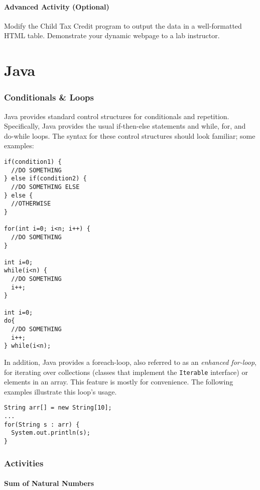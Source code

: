 \documentclass[12pt]{scrartcl}
\begin{document}
\subsection*{Advanced Activity (Optional)}
	
Modify the Child Tax Credit program to output the data in a 
well-formatted HTML table.  Demonstrate your dynamic webpage 
to a lab instructor.


\newpage
\part*{Java}

\section*{Conditionals \& Loops}

Java provides standard control structures for conditionals and 
repetition.  Specifically, Java provides the usual if-then-else 
statements and while, for, and do-while loops.  The syntax for 
these control structures should look familiar; some examples:

\begin{verbatim}
if(condition1) {
  //DO SOMETHING
} else if(condition2) {
  //DO SOMETHING ELSE
} else {
  //OTHERWISE
}

for(int i=0; i<n; i++) {
  //DO SOMETHING
}

int i=0;
while(i<n) {
  //DO SOMETHING
  i++;
}

int i=0;
do{ 
  //DO SOMETHING
  i++;
} while(i<n);
\end{verbatim}

In addition, Java provides a foreach-loop, also referred to as an 
\emph{enhanced for-loop}, for iterating over collections (classes 
that implement the \texttt{Iterable} interface) or elements 
in an array.  This feature is mostly for convenience.  The following 
examples illustrate this loop's usage.

\begin{verbatim}
String arr[] = new String[10];
...
for(String s : arr) {
  System.out.println(s); 
}
\end{verbatim}

\section*{Activities}

\subsection*{Sum of Natural Numbers}
\end{document}
